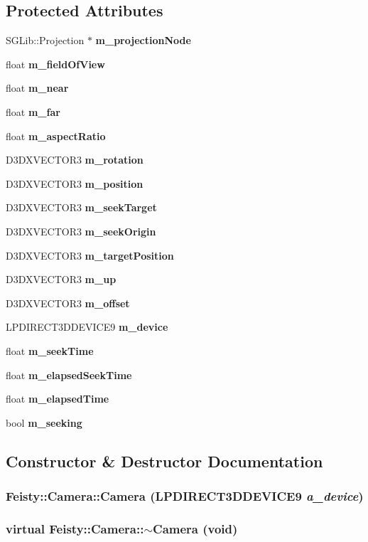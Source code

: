 \subsection*{Protected Attributes}
\begin{DoxyCompactItemize}
\item 
SGLib::Projection $\ast$ {\bf m\_\-projectionNode}
\item 
float {\bf m\_\-fieldOfView}
\item 
float {\bf m\_\-near}
\item 
float {\bf m\_\-far}
\item 
float {\bf m\_\-aspectRatio}
\item 
D3DXVECTOR3 {\bf m\_\-rotation}
\item 
D3DXVECTOR3 {\bf m\_\-position}
\item 
D3DXVECTOR3 {\bf m\_\-seekTarget}
\item 
D3DXVECTOR3 {\bf m\_\-seekOrigin}
\item 
D3DXVECTOR3 {\bf m\_\-targetPosition}
\item 
D3DXVECTOR3 {\bf m\_\-up}
\item 
D3DXVECTOR3 {\bf m\_\-offset}
\item 
LPDIRECT3DDEVICE9 {\bf m\_\-device}
\item 
float {\bf m\_\-seekTime}
\item 
float {\bf m\_\-elapsedSeekTime}
\item 
float {\bf m\_\-elapsedTime}
\item 
bool {\bf m\_\-seeking}
\end{DoxyCompactItemize}


\subsection{Constructor \& Destructor Documentation}
\subsubsection[{Camera}]{\setlength{\rightskip}{0pt plus 5cm}Feisty::Camera::Camera (LPDIRECT3DDEVICE9 {\em a\_\-device})\hspace{0.3cm}{\ttfamily  [inline]}}\label{class_feisty_1_1_camera_a7480bd2212144072df9186aba48a93e4}
\subsubsection[{$\sim$Camera}]{\setlength{\rightskip}{0pt plus 5cm}virtual Feisty::Camera::$\sim$Camera (void)\hspace{0.3cm}{\ttfamily  [inline, virtual]}}\label{class_feisty_1_1_camera_a8dd5a9f236d04875100a7404ada01edc}


